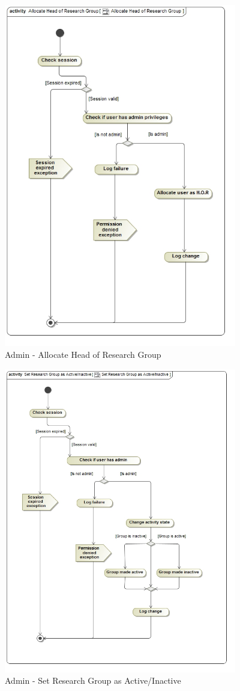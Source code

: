 \documentclass{article}
\begin{document}
				\begin{figure}[H]
					\includegraphics[width=4in, center]{../Diagrams/Process Specifications/Group control subsystem/Allocate Head of Research Group.jpg}
					\caption{Admin - Allocate Head of Research Group}
				\end{figure}
				\begin{figure}[H]
					\includegraphics[width=4in, center]{../Diagrams/Process Specifications/Group control subsystem/Set Research Group as Active_Inactive.jpg}
					\caption{Admin - Set Research Group as Active/Inactive}
				\end{figure}
\end{document}
